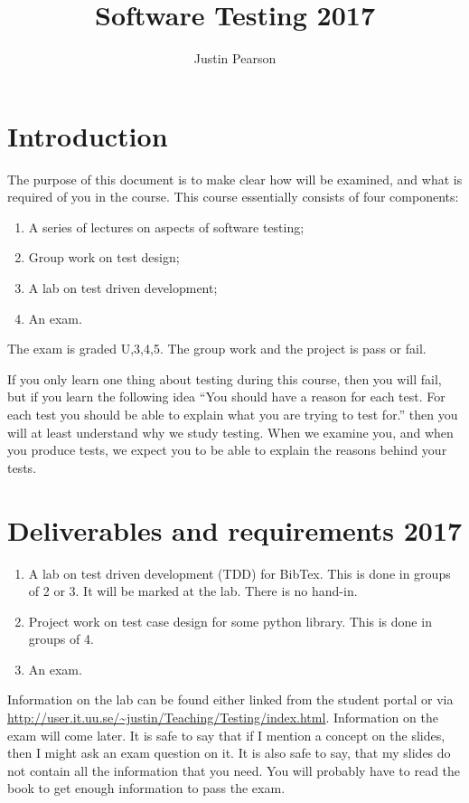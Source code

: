 \documentclass[a4page]{article}
\title{Software Testing 2017}
\author{Justin Pearson}
\begin{document}
\maketitle


\section{Introduction}
The purpose of this document is to make clear how will be examined, and
what is required of you in the course.  This course essentially consists of
four components:
\begin{enumerate}
\item A series of lectures on aspects of software testing;
\item Group work on test design;
\item A lab on test driven development;
\item An exam.
\end{enumerate}
The exam is graded U,3,4,5. The group work and the project is pass or fail.

If you only learn one thing about testing during this course, then you will
fail, but if you learn the following idea ``You should have a reason for each
test. For each test you should be able to explain what you are trying to test
for.'' then you will at least understand why we study testing. When we examine
you, and when you produce tests, we expect you to be able to explain the
reasons behind your tests.


\section{Deliverables and requirements  2017}



\begin{enumerate}
\item A lab on  test driven development (TDD) for  BibTex.   This is
  done in groups of 2 or 3. It will be marked at the lab. There is no
  hand-in. 


\item Project work on test case design for some python library. This
  is done in groups of 4.
\item An exam.

  \end{enumerate}


  Information on the lab can be found either linked from the student portal or
  via
  \url{http://user.it.uu.se/~justin/Teaching/Testing/index.html}. Information
  on the exam will come later. It is safe to say that if I mention a concept
  on the slides, then I might ask an exam question on it. It is also safe to
  say, that my slides do not contain all the information that you need. You
  will probably have to read the book to get enough information to pass the
  exam.
\end{document}
